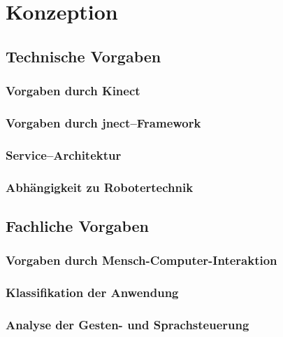 \chapter{Konzeption}
\label{chap:Konzeption}

\section{Technische Vorgaben}

\subsection{Vorgaben durch Kinect}

\subsection{Vorgaben durch jnect--Framework}

\subsection{Service--Architektur}

\subsection{Abh\"angigkeit zu Robotertechnik}

\section{Fachliche Vorgaben}

\subsection{Vorgaben durch Mensch-Computer-Interaktion}
\label{subsec:MCI}

\subsection{Klassifikation der Anwendung}

\subsection{Analyse der Gesten- und Sprachsteuerung}
\label{subsec:Analyse}
